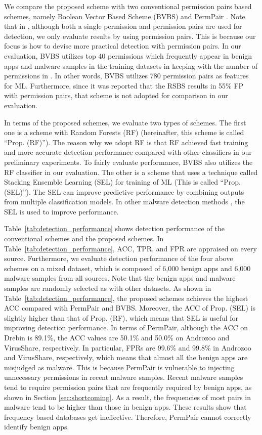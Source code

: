 \documentclass{ieeeaccess}
\newcommand{\mytablename}{Table}
\begin{document}
We compare the proposed scheme with two conventional permission pairs based schemes, namely Boolean Vector Based Scheme (BVBS) \cite{liu2014two} and PermPair \cite{arora2019permpair}.
Note that in \cite{liu2014two}, although both a single permission and permission pairs are used for detection, we only evaluate results by using permission pairs.
This is because our focus is how to devise more practical detection with permission pairs.
In our evaluation, BVBS utilizes top 40 permissions which frequently appear in benign apps and malware samples in the training datasets in keeping with the number of permissions in \cite{liu2014two}.
In other words, BVBS utilizes 780 permission pairs as features for ML.
Furthermore, since it was reported that the RSBS \cite{liang2014permission} results in 55\% FP with permission pairs, that scheme is not adopted for comparison in our evaluation.

In terms of the proposed schemes, we evaluate two types of schemes.
The first one is a scheme with Random Forests (RF) \cite{breiman2001random} (hereinafter, this scheme is called ``Prop. (RF)'').
The reason why we adopt RF is that RF achieved fast training and more accurate detection performance compared with other classifiers in our preliminary experiments.
To fairly evaluate performance, BVBS also utilizes the RF classifier in our evaluation.
The other is a scheme that uses a technique called Stacking Ensemble Learning (SEL) for training of ML (This is called ``Prop. (SEL)'').
The SEL can improve predictive performance by combining outputs from multiple classification models.
In other malware detection methods \cite{vasan2020mthael, zhu2020sedmdroid}, the SEL is used to improve performance.

\mytablename~\ref{tab:detection_performance} shows detection performance of the conventional schemes and the proposed schemes.
In \mytablename~\ref{tab:detection_performance}, ACC, TPR, and FPR are appraised on every source. 
Furthermore, we evaluate detection performance of the four above schemes on a mixed dataset, which is composed of 6,000 benign apps and 6,000 malware samples from all sources.
Note that the benign apps and malware samples are randomly selected as with other datasets.
As shown in \mytablename~\ref{tab:detection_performance}, the proposed schemes achieves the highest ACC compared with PermPair and BVBS.
Moreover, the ACC of Prop. (SEL) is slightly higher than that of Prop. (RF), which means that SEL is useful for improving detection performance.
In terms of PermPair, although the ACC on Drebin is 89.1\%, the ACC values are 50.1\% and 50.0\% on Androzoo and VirusShare, respectively.
In particular, FPRs are 99.6\% and 99.8\% in Androzoo and VirusShare, respectively, which means that almost all the benign apps are misjudged as malware.
This is because PermPair is vulnerable to injecting unnecessary permissions in recent malware samples.
Recent malware samples tend to require permission pairs that are frequently required by benign apps, as shown in Section \ref{sec:shortcoming}.
As a result, the frequencies of most pairs in malware tend to be higher than those in benign apps.
These results show that frequency based databases get ineffective.
Therefore, PermPair cannot correctly identify benign apps.
\end{document}

